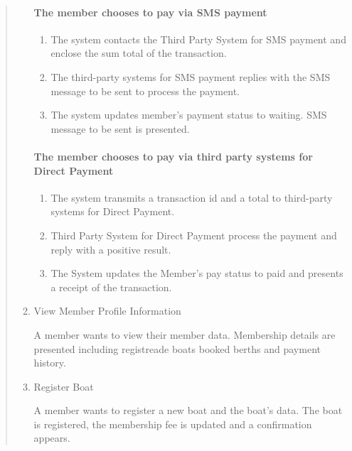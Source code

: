 \begin{quote}
\begin{enumerate}
  \paragraph{The member chooses to pay via SMS payment}
  \begin{enumerate}
    \tightlist
    \item
      The system contacts the Third Party System for SMS payment and enclose
      the sum total of the transaction.
    \item
      The third-party systems for SMS payment replies with the SMS message to
      be sent to process the payment.
    \item
      The system updates member's payment status to waiting. SMS message to be
      sent is presented.
  \end{enumerate}
  
  \paragraph{The member chooses to pay via third party systems for Direct Payment}
  \begin{enumerate}
    \tightlist
    \item
      The system transmits a transaction id and a total to third-party systems
      for Direct Payment.
    \item
      Third Party System for Direct Payment process the payment and reply with
      a positive result.
    \item
      The System updates the Member's pay status to paid and presents a receipt
      of the transaction.
  \end{enumerate}



  \item
  View Member Profile Information
  
  A member wants to view their member data. Membership details are presented
  including registreade boats booked berths and payment history.


  \item
  Register Boat

  A member wants to register a new boat and the boat's data. The boat is
  registered, the membership fee is updated and a confirmation appears.


\end{enumerate}
\end{quote}
